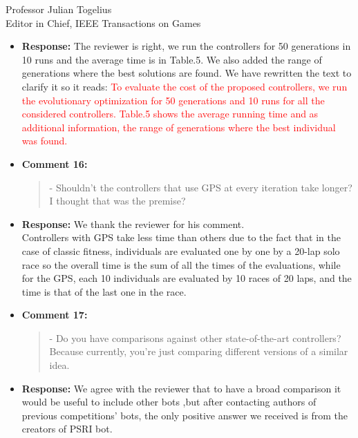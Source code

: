 \documentclass[10pt]{letter} %
\begin{document}
\begin{letter}{Professor Julian Togelius \\ Editor in Chief, IEEE Transactions on Games}
\begin{enumerate}
\begin{itemize}
\begin{quote}
				\end{quote}	
			\item {\bf Response:} 
					The reviewer is right, we run the  controllers for 50 generations in 10 runs and the average time is in Table.5. We also added the range of generations where the best solutions are found.
					We have rewritten the text to clarify it so it reads:
						\textcolor{red}{
						To evaluate the cost of the proposed controllers, we run the evolutionary optimization for 50 generations and 10 runs for all the considered controllers.
						Table.5 shows the average running time and  as additional information, the range of generations where the best individual was found. } 
			\item {\bf Comment 16:}
				\begin{quote}	
				- Shouldn't the controllers that use GPS at every iteration take longer? I thought that was the premise?
				\end{quote}	
			\item {\bf Response:} 
				We thank the reviewer for his comment. \\
				Controllers with GPS take less time than others due to the fact that in the case of classic fitness, individuals are evaluated one by one by a 20-lap solo race so the overall time is the sum of all the times of the evaluations, while for the GPS, each 10 individuals are evaluated by 10 races of 20 laps, and the time is that of the last one in the race.
			\item {\bf Comment 17:}
				\begin{quote}	
					- Do you have comparisons against other state-of-the-art controllers? Because currently, you're just comparing different versions of a similar idea.
				\end{quote}	

			\item {\bf Response:} 
		We agree with the reviewer that to have a broad comparison it would be useful to include other bots ,but after contacting authors of previous competitions' bots, the only positive answer we received is from the creators of PSRI bot.	
			
	\end{itemize}	

\end{enumerate}
 


\end{letter}
\end{document}
